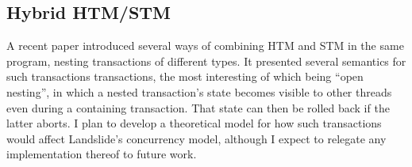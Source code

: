 \subsection{Hybrid HTM/STM}

A recent paper \cite{hybrid-htm-stm} introduced several ways of combining HTM and STM in the same program, nesting transactions of different types.
It presented several semantics for such transactions transactions, the most interesting of which being ``open nesting'', in which a nested transaction's state becomes visible to other threads even during a containing transaction.
That state can then be rolled back if the latter aborts.
I plan to develop a theoretical model for how such transactions would affect Landslide's concurrency model,
although I expect to relegate any implementation thereof to future work.
